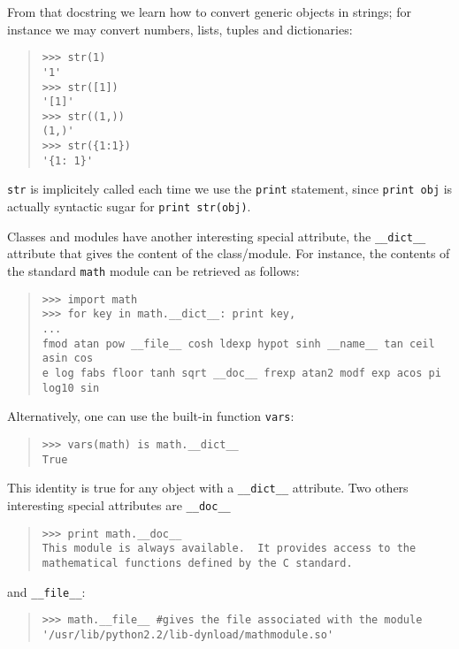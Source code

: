 \documentclass[10pt,english]{article}
\begin{document}
From that docstring we learn how to convert generic objects in strings;
for instance we may convert numbers, lists, tuples and dictionaries:
\begin{quote}
\begin{verbatim}>>> str(1)
'1'
>>> str([1])
'[1]'
>>> str((1,))
(1,)'
>>> str({1:1})
'{1: 1}'\end{verbatim}
\end{quote}

\texttt{str} is implicitely called each time we use the \texttt{print} statement, since
\texttt{print obj} is actually syntactic sugar for \texttt{print str(obj)}.

Classes and modules have another interesting special attribute, the 
\texttt{{\_}{\_}dict{\_}{\_}} attribute that gives the content of the class/module.
For instance, the contents of the standard \texttt{math} module can be retrieved 
as follows:
\begin{quote}
\begin{verbatim}>>> import math
>>> for key in math.__dict__: print key,
...
fmod atan pow __file__ cosh ldexp hypot sinh __name__ tan ceil asin cos 
e log fabs floor tanh sqrt __doc__ frexp atan2 modf exp acos pi log10 sin\end{verbatim}
\end{quote}

Alternatively, one can use the built-in function \texttt{vars}:
\begin{quote}
\begin{verbatim}>>> vars(math) is math.__dict__
True\end{verbatim}
\end{quote}

This identity is true for any object with a \texttt{{\_}{\_}dict{\_}{\_}} attribute. 
Two others interesting special attributes are \texttt{{\_}{\_}doc{\_}{\_}}
\begin{quote}
\begin{verbatim}>>> print math.__doc__
This module is always available.  It provides access to the
mathematical functions defined by the C standard. \end{verbatim}
\end{quote}

and \texttt{{\_}{\_}file{\_}{\_}}:
\begin{quote}
\begin{verbatim}>>> math.__file__ #gives the file associated with the module
'/usr/lib/python2.2/lib-dynload/mathmodule.so'\end{verbatim}
\end{quote}
\end{document}
